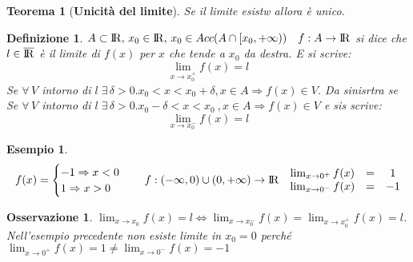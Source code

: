 \documentclass[12pt, a4paper]{article}
\theoremstyle{break}
\newtheorem{theorem}{Teorema}[subsection]
\newtheorem{definition}{Definizione}[subsection]
\newtheorem{example}{Esempio}[subsection]
\newtheorem{observation}{Osservazione}[subsection]
\newcommand\R{{\rm I\!R}}
\newcommand\Rext{\overline{\R}}
\newcommand{\func}[3]{#1:#2\rightarrow #3}
\begin{document}
    \begin{theorem}[\textbf{Unicità del limite}]
        Se il limite esistw allora è unico.
    \end{theorem}
    \newpage
    \begin{definition}
        $A\subset\R ,\, x_0\in\R ,\, x_0\in Acc(A\cap[x_0,+\infty))\quad \func{f}{A}{\R}$ si dice che $l\in\Rext$ è il limite di $f(x)$ per $x$ che tende a $x_0$ da destra. E si scrive:
        \[\lim_{x\rightarrow x_0^+} f(x)=l\]
        Se $\forall\, V$ intorno di $l\; \exists\,\delta > 0. x_0<x<x_0+\delta , x\in A \Rightarrow f(x)\in V$.\newline
        Da sinisrtra se  
        Se $\forall\, V$ intorno di $l\; \exists\,\delta > 0. x_0-\delta <x<x_0\ , x\in A \Rightarrow f(x)\in V$ e sis scrive:
        \[\lim_{x\rightarrow x_0^-} f(x)=l\]
    \end{definition}
    \begin{example}
        \[
            f(x) = 
            \begin{cases}
                -1 \Rightarrow x<0 \\
                1 \Rightarrow x>0
            \end{cases}
            \quad \func{f}{(-\infty,0)\cup(0,+\infty)}{\R}\quad
            \begin{matrix}
                \lim_{x\rightarrow 0^+} f(x) & = & 1\\
                \lim_{x\rightarrow 0^-} f(x) & = & -1\\
            \end{matrix}
        \]
        \begin{figure}[!htb]
            \centering
        \end{figure}
    \end{example}
    \begin{observation}
        $\lim_{x\rightarrow x_0} f(x) = l \Leftrightarrow \lim_{x\rightarrow x_0^-} f(x) = \lim_{x\rightarrow x_0^+} f(x) = l$.\newline
        Nell'esempio precedente non esiste limite in $x_0 = 0$ perché $\lim_{x\rightarrow 0^+} f(x) = 1 \neq \lim_{x\rightarrow 0^-} f(x) = -1$
    \end{observation}
\end{document}
